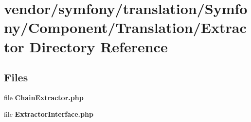 \section{vendor/symfony/translation/\+Symfony/\+Component/\+Translation/\+Extractor Directory Reference}
\label{dir_8c3633bff02021decfa68dd91532022a}
\subsection*{Files}
\begin{DoxyCompactItemize}
\item 
file {\bf Chain\+Extractor.\+php}
\item 
file {\bf Extractor\+Interface.\+php}
\end{DoxyCompactItemize}

